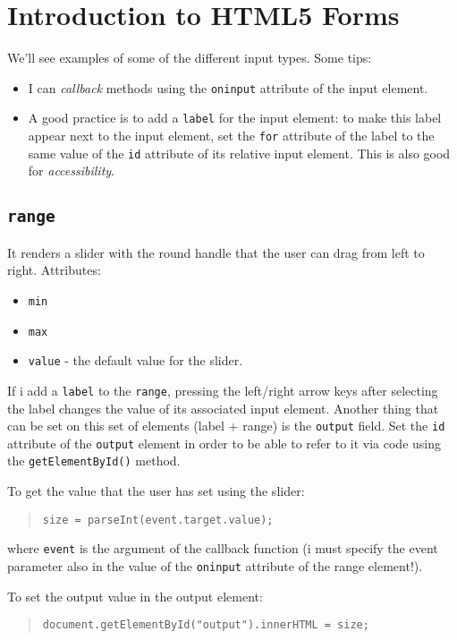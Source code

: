 \documentclass[a4paper,11pt]{book}
\begin{document}
\section{Introduction to HTML5 Forms}
We'll see examples of some of the different input types.
Some tips:
\begin{itemize}
\item I can \textit{callback} methods using the \texttt{oninput} attribute of
the input element.
\item A good practice is to add a \texttt{label} for the input element: to make
this label appear next to the input element, set the \texttt{for} attribute of
the label to the same value of the \texttt{id} attribute of its relative input
element. This is also good for \emph{accessibility}. 
\end{itemize}

\subsection{\texttt{range}}
It renders a slider with the round handle that the user can drag from left to right.
Attributes:
\begin{itemize}
\item \texttt{min}
\item \texttt{max}
\item \texttt{value} - the default value for the slider.
\end{itemize}

If i add a \texttt{label} to the \texttt{range}, pressing
the left/right arrow keys after selecting the label changes the value of its associated input element.
Another thing that can be set on this set of elements (label + range) is the \texttt{output} field. Set the
\texttt{id} attribute of the \texttt{output} element in order to be able to refer to it via code using the
\texttt{getElementById()} method.

To get the value that the user has set using the slider: \\
\begin{verse}\texttt{size = parseInt(event.target.value);}\end{verse}
where \texttt{event} is the argument of the callback function (i must
specify the event parameter also in the value of the \texttt{oninput} attribute
of the range element!).

To set the output value in the output element: \\ 
\begin{verse}
\texttt{document.getElementById("output").innerHTML = size;}
\end{verse}
\end{document}
